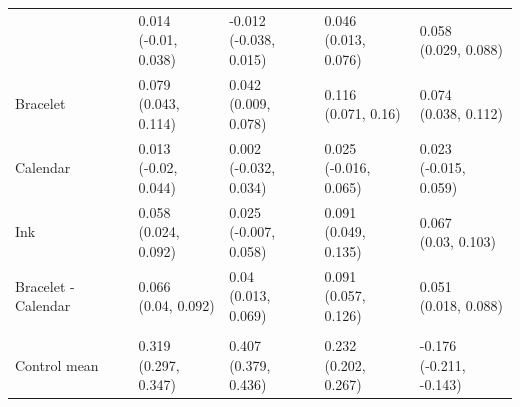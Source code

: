 {\begin{tabular}[t]{lllll}
\addlinespace[0.3em]
\hline
\multicolumn{5}{l}{\textit{\textbf{Panel B: Signalling}}}\\
\hline
\hspace{1em} & \makecell[c]{0.014\\(-0.01, 0.038)} & \makecell[c]{-0.012\\(-0.038, 0.015)} & \makecell[c]{0.046\\(0.013, 0.076)} & \makecell[c]{0.058\\(0.029, 0.088)}\\
\hspace{1em}Bracelet & \makecell[c]{0.079\\(0.043, 0.114)} & \makecell[c]{0.042\\(0.009, 0.078)} & \makecell[c]{0.116\\(0.071, 0.16)} & \makecell[c]{0.074\\(0.038, 0.112)}\\
\hspace{1em}Calendar & \makecell[c]{0.013\\(-0.02, 0.044)} & \makecell[c]{0.002\\(-0.032, 0.034)} & \makecell[c]{0.025\\(-0.016, 0.065)} & \makecell[c]{0.023\\(-0.015, 0.059)}\\
\midrule
\hspace{1em}Ink & \makecell[c]{0.058\\(0.024, 0.092)} & \makecell[c]{0.025\\(-0.007, 0.058)} & \makecell[c]{0.091\\(0.049, 0.135)} & \makecell[c]{0.067\\(0.03, 0.103)}\\
\hspace{1em}Bracelet - Calendar & \makecell[c]{0.066\\(0.04, 0.092)} & \makecell[c]{0.04\\(0.013, 0.069)} & \makecell[c]{0.091\\(0.057, 0.126)} & \makecell[c]{0.051\\(0.018, 0.088)}\\
\addlinespace[0.3em]
\hline
\multicolumn{5}{l}{\textit{\textbf{Panel C: Private}}}\\
\hline
\hspace{1em}Control mean & \makecell[c]{0.319\\(0.297, 0.347)} & \makecell[c]{0.407\\(0.379, 0.436)} & \makecell[c]{0.232\\(0.202, 0.267)} & \makecell[c]{-0.176\\(-0.211, -0.143)}\\

\end{tabular}}
